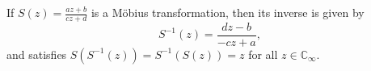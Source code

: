 If $S(z) = \frac{az+b}{cz+d}$ is a Möbius transformation, then its inverse is given by
$$S^{-1}(z) = \frac{dz - b}{-cz + a},$$
and satisfies $S(S^{-1}(z)) = S^{-1}(S(z)) = z$ for all $z \in \mathbb{C}_\infty$.
